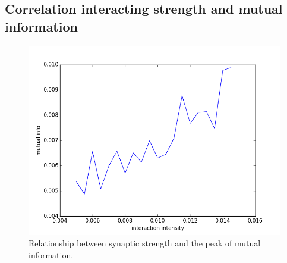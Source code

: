 \documentclass{article}
\begin{document}
		\subsection{Correlation interacting strength and mutual information}
			\begin{figure}[ht]
				\centering
				\includegraphics[scale = 0.5]{oct7.png}
				\caption{Relationship between synaptic strength and the peak of mutual information.}
				\label{fig:relation}
			\end{figure}
\end{document}
